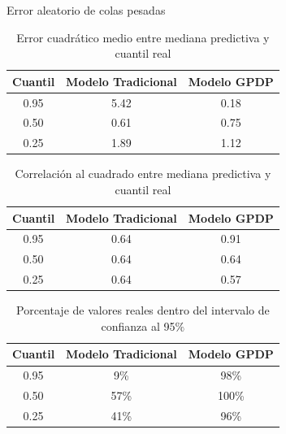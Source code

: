 \documentclass{beamer}
\begin{document}
\begin{frame}{Error aleatorio de colas pesadas}

\begin{scriptsize}

\begin{table}[H]
    \centering
    \caption{Error cuadr\'atico medio entre mediana predictiva y cuantil real}
    \begin{tabular}{ccc}
    \hline
    Cuantil & Modelo Tradicional & Modelo GPDP \\ 
    \hline
    0.95 & 5.42 & 0.18 \\ 
    0.50 & 0.61 & 0.75 \\ 
    0.25 & 1.89 & 1.12 \\ 
    \hline
    \end{tabular}
\end{table}
\begin{table}[H]
    \centering
    \caption{Correlaci\'on al cuadrado entre mediana predictiva y cuantil real} 
    \begin{tabular}{ccc}
    \hline
    Cuantil & Modelo Tradicional & Modelo GPDP \\ 
    \hline
    0.95 & 0.64 & 0.91 \\ 
    0.50 & 0.64 & 0.64 \\ 
    0.25 & 0.64 & 0.57 \\ 
    \hline
    \end{tabular}
\end{table}

\begin{table}[H]
    \centering
    \caption{Porcentaje de valores reales dentro del intervalo de confianza al 95$\%$} 
    \begin{tabular}{ccc}
    \hline
    Cuantil & Modelo Tradicional & Modelo GPDP \\ 
    \hline
    0.95 & 9\% & 98\% \\ 
    0.50 & 57\% & 100\% \\ 
    0.25 & 41\% & 96\% \\ 
    \hline
    \end{tabular}
\end{table}

\end{scriptsize}
\end{frame}
\end{document}

